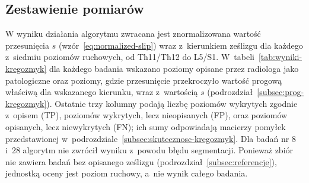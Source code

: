 \subsection{Zestawienie pomiarów}
\label{subsec:zestawienie-kregozmyk}

W wyniku działania algorytmu zwracana jest znormalizowana wartość przesunięcia $s$ (wzór~\ref{eq:normalized-slip}) wraz z~kierunkiem ześlizgu dla każdego z~siedmiu poziomów ruchowych, od Th11/Th12 do L5/S1.
W~tabeli~\ref{tab:wyniki-kregozmyk} dla każdego badania wskazano poziomy opisane przez radiologa jako patologiczne oraz poziomy, gdzie przesunięcie przekroczyło wartość progową właściwą dla wskazanego kierunku, wraz z~wartością $s$ (podrozdział~\ref{subsec:prog-kregozmyk}).
Ostatnie trzy kolumny podają liczbę poziomów wykrytych zgodnie z~opisem (TP), poziomów wykrytych, lecz nieopisanych (FP), oraz poziomów opisanych, lecz niewykrytych (FN); ich sumy odpowiadają macierzy pomyłek przedstawionej w~podrozdziale~\ref{subsec:skutecznosc-kregozmyk}.
Dla badań nr 8 i~28 algorytm nie zwrócił wyniku z~powodu błędu segmentacji.
Ponieważ zbiór nie zawiera badań bez opisanego ześlizgu (podrozdział~\ref{subsec:referencje}), jednostką oceny jest poziom ruchowy, a~nie wynik całego badania.

